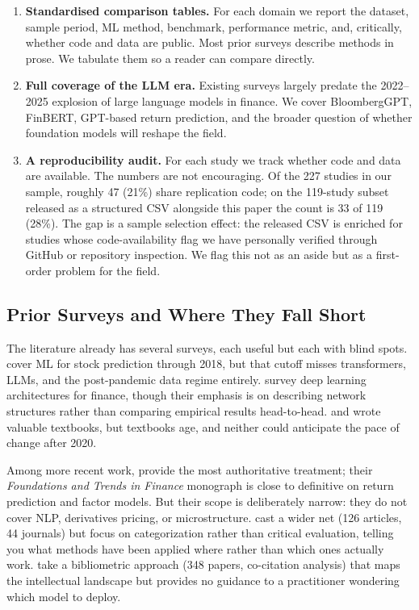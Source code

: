 \begin{enumerate}[leftmargin=*]
    \item \textbf{Standardised comparison tables.} For each domain we report the dataset, sample period, ML method, benchmark, performance metric, and, critically, whether code and data are public. Most prior surveys describe methods in prose. We tabulate them so a reader can compare directly.

    \item \textbf{Full coverage of the LLM era.} Existing surveys largely predate the 2022--2025 explosion of large language models in finance. We cover BloombergGPT, FinBERT, GPT-based return prediction, and the broader question of whether foundation models will reshape the field.

    \item \textbf{A reproducibility audit.} For each study we track whether code and data are available. The numbers are not encouraging. Of the 227 studies in our sample, roughly 47 (21\%) share replication code; on the 119-study subset released as a structured CSV alongside this paper the count is 33 of 119 (28\%). The gap is a sample selection effect: the released CSV is enriched for studies whose code-availability flag we have personally verified through GitHub or repository inspection. We flag this not as an aside but as a first-order problem for the field.
\end{enumerate}

\subsection{Prior Surveys and Where They Fall Short}

The literature already has several surveys, each useful but each with blind spots. \citet{Henrique2019} cover ML for stock prediction through 2018, but that cutoff misses transformers, LLMs, and the post-pandemic data regime entirely. \citet{Ozbayoglu2020} survey deep learning architectures for finance, though their emphasis is on describing network structures rather than comparing empirical results head-to-head. \citet{DePrado2018} and \citet{Dixon2020} wrote valuable textbooks, but textbooks age, and neither could anticipate the pace of change after 2020.

Among more recent work, \citet{KellyXiu2023} provide the most authoritative treatment; their \textit{Foundations and Trends in Finance} monograph is close to definitive on return prediction and factor models. But their scope is deliberately narrow: they do not cover NLP, derivatives pricing, or microstructure. \citet{NazarethReddy2023} cast a wider net (126 articles, 44 journals) but focus on categorization rather than critical evaluation, telling you what methods have been applied where rather than which ones actually work. \citet{Goodell2022} take a bibliometric approach (348 papers, co-citation analysis) that maps the intellectual landscape but provides no guidance to a practitioner wondering which model to deploy.

